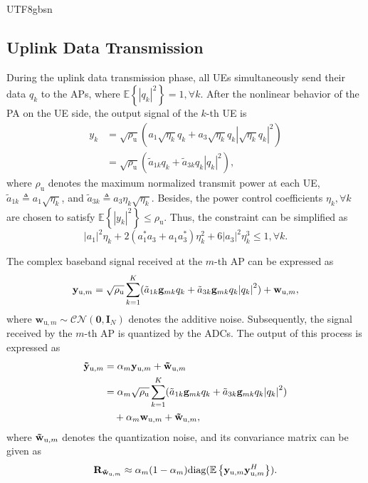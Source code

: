 \documentclass[lettersize,journal]{IEEEtran}
\begin{document}
\begin{CJK}{UTF8}{gbsn}
\subsection{Uplink Data Transmission}
During the uplink data transmission phase, all UEs simultaneously send their data ${q_k}$ to the APs, where $\mathbb{E}  \left \{ \left | q_k \right |^2  \right \} =1, \forall k$. After the nonlinear behavior of the PA on the UE side, the output signal of the $k$-th UE is
\begin{align}
\label{eqn-9}{y_k} &= \sqrt {{\rho _\text{u}}} \left( {{a_1}\sqrt {{\eta _k}} {q_k} + {a_3}\sqrt {{\eta _k}} {q_k}{{\left| {\sqrt {{\eta _k}} {q_k}} \right|}^2}} \right)\nonumber \\ 
&= \sqrt {{\rho _\text{u}}} \left( {{\tilde{a}_{1k}}{q_k} + {\tilde{a}_{3k}}{q_k}{{\left| {{q_k}} \right|}^2}} \right),
\end{align}
where $\rho _\text{u}$ denotes the maximum normalized transmit power at each UE, $\tilde{a}_{1k} \triangleq a_1\sqrt{\eta _k}$, and $\tilde{a}_{3k} \triangleq a_3\eta _k\sqrt{\eta _k}$. Besides, the power control coefficients $\eta _k, \forall k$ are chosen to satisfy $\mathbb{E}\left\{ {{{\left| {{y_k}} \right|}^2}} \right\} \le {\rho _\text{u}}$. Thus, the constraint can be simplified as
\begin{equation}\label{eqn-10}
{\left| {{a_1}} \right|^2}{\eta _k} + 2(a_1^ * {a_3} + {a_1}a_3^ * )\eta _k^2 + 6{\left| {{a_3}} \right|^2}\eta _k^3 \le 1,  \forall k.
\end{equation}

The complex baseband signal received at the $m$-th AP can be expressed as
\begin{equation}\label{eqn-11}
{{\bf{y}}_{\text{u},m}} = \sqrt {{\rho _\text{u}}} \sum_{k = 1}^K ({\tilde{a}_{1k}}{{\bf{g}}_{mk}}{q_k} + {\tilde{a}_{3k}}{{\bf{g}}_{mk}}{q_k}{\left| {{q_k}} \right|^2}) + {\bf{w}}_{\text{u},m},
\end{equation}
where $\mathbf{w}_{\text{u},m}\sim \mathcal{CN} (\mathbf{0},\mathbf{I}_N) $ denotes the additive noise. Subsequently, the signal received by the $m$-th AP is quantized by the ADCs. The output of this process is expressed as
\begin{align}\label{eqn-12}{{\bf{\tilde y}}_{\text{u},m}} &= {\alpha _m}{{\bf{y}}_{\text{u},m}} + {{\bf{\tilde w}}_{\text{u},m}} \nonumber\\
&= {\alpha _m}\sqrt {{\rho _\text{u}}} \sum_{k = 1}^K ({\tilde{a}_{1k}}{{\bf{g}}_{mk}}{q_k} + {\tilde{a}_{3k}}{{\bf{g}}_{mk}}{q_k}{\left| {{q_k}} \right|^2}) \nonumber\\
&\quad+ {\alpha _m}{{\bf{w}}_{\text{u},m}} + {{\bf{\tilde w}}_{\text{u},m}},
\end{align}
where ${{\bf{\tilde w}}_{\text{u},m}}$ denotes the quantization noise, and its convariance matrix can be given as 
\begin{align}{\mathbf{R}_{{{{\bf{\tilde w}}}_{\text{u},m}}}} \approx {\alpha _m}(1 - {\alpha _m})\text{diag}(\mathbb{E}\left\{ {{{\bf{y}}_{\text{u},m}}{\bf{y}}_{\text{u},m}^H} \right\}).\end{align}


\end{CJK}
\end{document}

